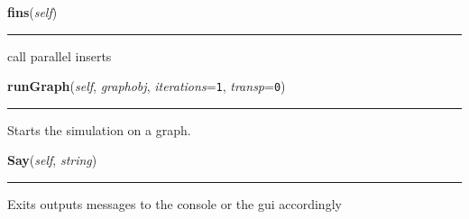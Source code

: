     \label{Epigrass:manager:simulate:fins}

    \vspace{0.5ex}

    \begin{boxedminipage}{\textwidth}

    \raggedright \textbf{fins}(\textit{self})

    \vspace{-1.5ex}

    \rule{\textwidth}{0.5\fboxrule}
    call parallel inserts

    \vspace{1ex}

    \end{boxedminipage}

    \label{Epigrass:manager:simulate:runGraph}

    \vspace{0.5ex}

    \begin{boxedminipage}{\textwidth}

    \raggedright \textbf{runGraph}(\textit{self}, \textit{graphobj}, \textit{iterations}=\texttt{1}, \textit{transp}=\texttt{0})

    \vspace{-1.5ex}

    \rule{\textwidth}{0.5\fboxrule}
    Starts the simulation on a graph.

    \vspace{1ex}

    \end{boxedminipage}

    \label{Epigrass:manager:simulate:Say}

    \vspace{0.5ex}

    \begin{boxedminipage}{\textwidth}

    \raggedright \textbf{Say}(\textit{self}, \textit{string})

    \vspace{-1.5ex}

    \rule{\textwidth}{0.5\fboxrule}
    Exits outputs messages to the console or the gui accordingly

    \vspace{1ex}

    \end{boxedminipage}

